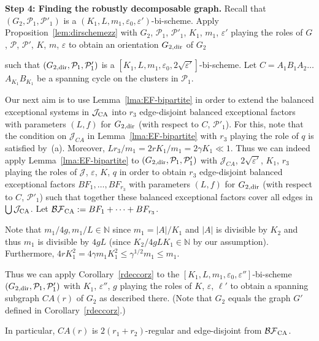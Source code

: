 \documentclass{memo-l}
\def\COMMENT#1{}
\def\cP{\mathcal{P}}
\def\eps{\varepsilon}
\def\cJ{\mathcal{J}}
\def\epszero{\eps_0}
\numberwithin{section}{chapter}
\numberwithin{equation}{section}
\numberwithin{firstthm}{section}
\numberwithin{figure}{section}
\begin{document}
{\smallskip

\noindent\textbf{Step 4: Finding the robustly decomposable graph.}
Recall that $(G_2, \mathcal{P}_1,\cP'_1)$ is a $(K_1, L, m_1, \epszero,\eps')$-bi-scheme.
Apply Proposition~\ref{lem:dirschemezz} with $G_2$, $\cP_1$, $\cP'_1$, $K_1$, $m_1$, $\eps'$ playing the roles of
$G$, $\cP$, $\cP'$, $K$, $m$, $\eps$ to obtain an orientation $G_{2,{\rm dir}}$ of $G_2$%
  \COMMENT{Daniela: had $G_2-V_0$, but now $G_2$ doesn't include $V_0$ anymore}
such that
$(G_{2,{\rm dir}}, \mathcal{P}_1,\cP'_1)$ is a $[K_1, L, m_1, \epszero,2\sqrt{\eps'}]$-bi-scheme. 
Let $C=A_1B_1A_2\dots $ $A_{K_1}B_{K_1}$ be a spanning cycle on the clusters in $\cP_1$.

Our next aim is to use Lemma~\ref{lma:EF-bipartite} in order to extend the balanced exceptional systems in $\mathcal{J}_{\rm CA}$ into $r_3$ edge-disjoint
balanced exceptional factors with parameters $(L,f)$ for $G_{2,{\rm dir}}$ (with respect to $C$, $\mathcal P'_1$).
For this, note that the condition on $\cJ_{CA}$ in Lemma~\ref{lma:EF-bipartite} with $r_3$ playing the role of $q$ is satisfied by~(a). 
Moreover, $Lr_3/m_1=2rK_1/m_1=2\gamma K_1\ll 1$. 
Thus we can indeed apply Lemma~\ref{lma:EF-bipartite} to $(G_{2,{\rm dir}}, \mathcal{P}_1,\cP'_1)$
with $\cJ_{CA}$, $2\sqrt{\eps'}$, $K_1$, $r_3$ playing the roles of
$\cJ$, $\eps$, $K$, $q$ in order to obtain $r_3$ edge-disjoint balanced exceptional factors $BF_1,\dots,BF_{r_3}$ with parameters $(L,f)$
for $G_{2,{\rm dir}}$ (with respect to $C$, $\mathcal P'_1$) such that together these balanced exceptional factors
cover all edges in $\bigcup \mathcal{J}_{\rm CA}$. Let $\mathcal{BF}_{\rm CA}:=BF_1+\dots+ BF_{r_3}$.

Note that $m_1/4g,m_1/L\in\mathbb{N}$ since $m_1=|A|/K_1$ and $|A|$ is divisible by $K_2$ and thus $m_1$ is divisible
by $4gL$ (since $K_2/4gLK_1\in\mathbb{N}$ by our assumption).
Furthermore, $4rK_1^2=4\gamma m_1K_1^2\le \gamma^{1/2}m_1\le m_1$.%
\COMMENT{osthus adapted calculation from error in statement of rob dec corollary}
Thus we can apply Corollary~\ref{rdeccorz} to the $[K_1, L, m_1, \epszero,\eps'']$-bi-scheme
$(G_{2,{\rm dir}}, \mathcal{P}_1,\cP'_1)$ with $K_1$, $\eps''$, $g$ playing the roles of $K$, $\eps$, $\ell'$ to obtain a spanning
subgraph $CA(r)$ of $G_2$ as described there. (Note that $G_2$ equals the graph $G'$ defined in Corollary~\ref{rdeccorz}.)%
    \COMMENT{Daniela: had $G_2-V_0$ instead of $G_2$ (twice)}
In particular, $CA(r)$ is $2(r_1+r_2)$-regular and edge-disjoint from $\mathcal{BF}_{\rm CA}$.

}
\end{document}
